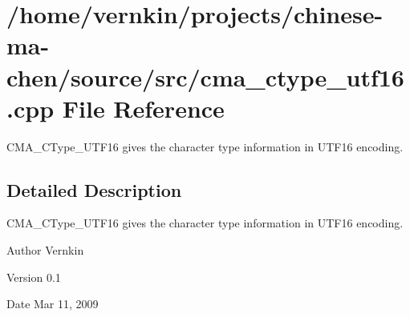 \section{/home/vernkin/projects/chinese-\/ma-\/chen/source/src/cma\_\-ctype\_\-utf16.cpp File Reference}
\label{cma__ctype__utf16_8cpp}


CMA\_\-CType\_\-UTF16 gives the character type information in UTF16 encoding.  


\subsection{Detailed Description}
CMA\_\-CType\_\-UTF16 gives the character type information in UTF16 encoding. \begin{DoxyAuthor}{Author}
Vernkin 
\end{DoxyAuthor}
\begin{DoxyVersion}{Version}
0.1 
\end{DoxyVersion}
\begin{DoxyDate}{Date}
Mar 11, 2009 
\end{DoxyDate}
